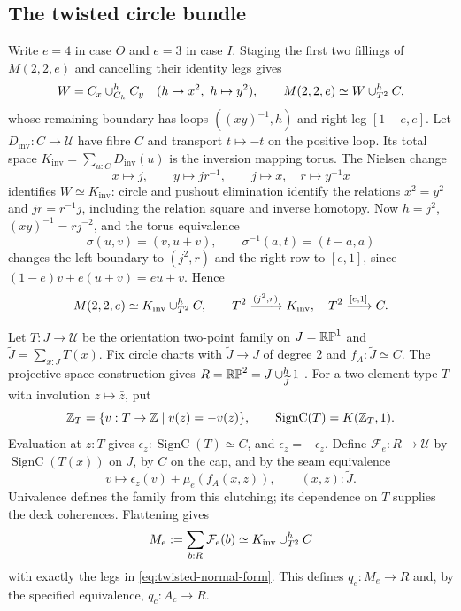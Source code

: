 \subsection{The twisted circle bundle}

Write $e=4$ in case $O$ and $e=3$ in case $I$. Staging the first two fillings of $M(2,2,e)$ and cancelling their identity legs gives
\begin{equation}\label{eq:staged-twisted}
W=C_x\mathbin{\cup}^{h}_{C_h}C_y\quad(h\mapsto x^2,\ h\mapsto y^2),
\qquad
M(2,2,e)\simeq W\mathbin{\cup}^{h}_{T^2}C,
\end{equation}
whose remaining boundary has loops $((xy)^{-1},h)$ and right leg $[1-e,e]$. Let $D_{\mathrm{inv}}:C\to\mathcal U$ have fibre $C$ and transport $t\mapsto-t$ on the positive loop. Its total space $K_{\mathrm{inv}}=\sum_{u:C}D_{\mathrm{inv}}(u)$ is the inversion mapping torus. The Nielsen change
\[
x\mapsto j,\qquad y\mapsto jr^{-1},\qquad
j\mapsto x,\quad r\mapsto y^{-1}x
\]
identifies $W\simeq K_{\mathrm{inv}}$: circle and pushout elimination identify the relations $x^2=y^2$ and $jr=r^{-1}j$, including the relation square and inverse homotopy. Now $h=j^2$, $(xy)^{-1}=rj^{-2}$, and the torus equivalence
\[
\sigma(u,v)=(v,u+v),\qquad \sigma^{-1}(a,t)=(t-a,a)
\]
changes the left boundary to $(j^2,r)$ and the right row to $[e,1]$, since $(1-e)v+e(u+v)=eu+v$. Hence
\begin{equation}\label{eq:twisted-normal-form}
M(2,2,e)\simeq K_{\mathrm{inv}}\mathbin{\cup}^{h}_{T^2}C,
\qquad T^2\xrightarrow{(j^2,r)}K_{\mathrm{inv}},\quad T^2\xrightarrow{[e,1]}C.
\end{equation}

Let $T:J\to\mathcal U$ be the orientation two-point family on $J=\mathbb{RP}^1$ and $\widetilde J=\sum_{x:J}T(x)$. Fix circle charts with $\widetilde J\to J$ of degree $2$ and $f_A:\widetilde J\simeq C$. The projective-space construction gives $R=\mathbb{RP}^2=J\mathbin{\cup}^{h}_{\widetilde J}1$ \cite{cubical}. For a two-element type $T$ with involution $z\mapsto\bar z$, put
\[
\mathbb Z_T=\{v:T\to\mathbb Z\mid v(\bar z)=-v(z)\},\qquad
\operatorname{SignC}(T)=K(\mathbb Z_T,1).
\]
Evaluation at $z:T$ gives $\epsilon_z:\operatorname{SignC}(T)\simeq C$, and $\epsilon_{\bar z}=-\epsilon_z$. Define $\mathcal F_e:R\to\mathcal U$ by $\operatorname{SignC}(T(x))$ on $J$, by $C$ on the cap, and by the seam equivalence
\begin{equation}\label{eq:sign-clutching}
v\longmapsto\epsilon_z(v)+\mu_e(f_A(x,z)),\qquad (x,z):\widetilde J.
\end{equation}
Univalence defines the family from this clutching; its dependence on $T$ supplies the deck coherences. Flattening gives
\[
M_e:=\sum_{b:R}\mathcal F_e(b)\simeq K_{\mathrm{inv}}\mathbin{\cup}^{h}_{T^2}C
\]
with exactly the legs in \eqref{eq:twisted-normal-form}. This defines $q_e:M_e\to R$ and, by the specified equivalence, $q_c:A_c\to R$.

